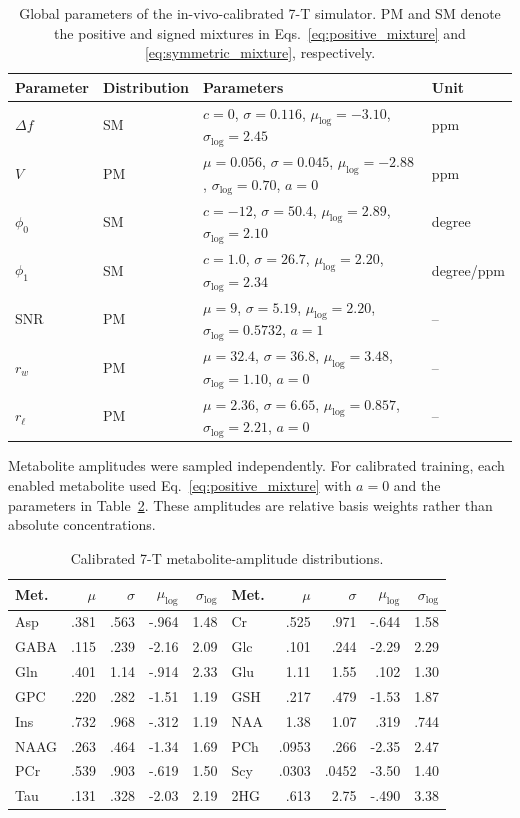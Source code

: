 \begin{table}[t]
\centering
\caption{Global parameters of the in-vivo-calibrated 7-T simulator.  PM and SM
denote the positive and signed mixtures in Eqs.~\eqref{eq:positive_mixture} and
\eqref{eq:symmetric_mixture}, respectively.}
\label{tab:calibrated_global_parameters}
\begin{tabular}{llll}
\toprule
Parameter & Distribution & Parameters & Unit \\
\midrule
$\Delta f$ & SM & $c=0$, $\sigma=0.116$, $\mu_{\log}=-3.10$, $\sigma_{\log}=2.45$ & ppm \\
$V$ & PM & $\mu=0.056$, $\sigma=0.045$, $\mu_{\log}=-2.88$, $\sigma_{\log}=0.70$, $a=0$ & ppm \\
$\phi_0$ & SM & $c=-12$, $\sigma=50.4$, $\mu_{\log}=2.89$, $\sigma_{\log}=2.10$ & degree \\
$\phi_1$ & SM & $c=1.0$, $\sigma=26.7$, $\mu_{\log}=2.20$, $\sigma_{\log}=2.34$ & degree/ppm \\
SNR & PM & $\mu=9$, $\sigma=5.19$, $\mu_{\log}=2.20$, $\sigma_{\log}=0.5732$, $a=1$ & -- \\
$r_w$ & PM & $\mu=32.4$, $\sigma=36.8$, $\mu_{\log}=3.48$, $\sigma_{\log}=1.10$, $a=0$ & -- \\
$r_\ell$ & PM & $\mu=2.36$, $\sigma=6.65$, $\mu_{\log}=0.857$, $\sigma_{\log}=2.21$, $a=0$ & -- \\
\bottomrule
\end{tabular}
\end{table}

Metabolite amplitudes were sampled independently.  For calibrated training,
each enabled metabolite used Eq.~\eqref{eq:positive_mixture} with $a=0$ and the
parameters in Table~\ref{tab:calibrated_metabolites}.  These amplitudes are
relative basis weights rather than absolute concentrations.

\begin{table}[t]
\centering
\caption{Calibrated 7-T metabolite-amplitude distributions.}
\label{tab:calibrated_metabolites}
\begin{tabular}{lrrrr@{\qquad}lrrrr}
\toprule
Met. & $\mu$ & $\sigma$ & $\mu_{\log}$ & $\sigma_{\log}$ &
Met. & $\mu$ & $\sigma$ & $\mu_{\log}$ & $\sigma_{\log}$ \\
\midrule
Asp  & .381 & .563 & -.964 & 1.48 & Cr   & .525 & .971 & -.644 & 1.58 \\
GABA & .115 & .239 & -2.16 & 2.09 & Glc  & .101 & .244 & -2.29 & 2.29 \\
Gln  & .401 & 1.14 & -.914 & 2.33 & Glu  & 1.11 & 1.55 & .102 & 1.30 \\
GPC  & .220 & .282 & -1.51 & 1.19 & GSH  & .217 & .479 & -1.53 & 1.87 \\
Ins  & .732 & .968 & -.312 & 1.19 & NAA  & 1.38 & 1.07 & .319 & .744 \\
NAAG & .263 & .464 & -1.34 & 1.69 & PCh  & .0953 & .266 & -2.35 & 2.47 \\
PCr  & .539 & .903 & -.619 & 1.50 & Scy  & .0303 & .0452 & -3.50 & 1.40 \\
Tau  & .131 & .328 & -2.03 & 2.19 & 2HG  & .613 & 2.75 & -.490 & 3.38 \\
\bottomrule
\end{tabular}
\end{table}

